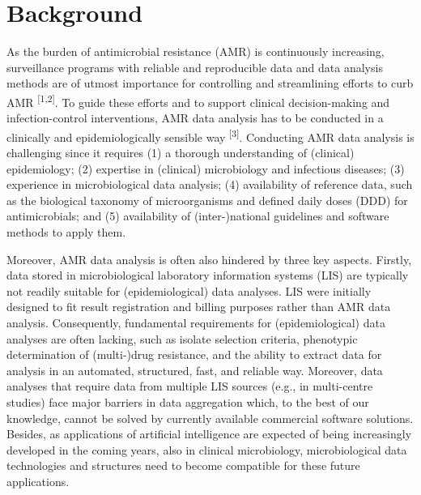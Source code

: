 \documentclass[
]{book}
\begin{document}
\hypertarget{background}{%
\section{Background}\label{background}}

As the burden of antimicrobial resistance (AMR) is continuously increasing, surveillance programs with reliable and reproducible data and data analysis methods are of utmost importance for controlling and streamlining efforts to curb AMR \textsuperscript{{[}1,2{]}}. To guide these efforts and to support clinical decision-making and infection-control interventions, AMR data analysis has to be conducted in a clinically and epidemiologically sensible way \textsuperscript{{[}3{]}}. Conducting AMR data analysis is challenging since it requires (1) a thorough understanding of (clinical) epidemiology; (2) expertise in (clinical) microbiology and infectious diseases; (3) experience in microbiological data analysis; (4) availability of reference data, such as the biological taxonomy of microorganisms and defined daily doses (DDD) for antimicrobials; and (5) availability of (inter-)national guidelines and software methods to apply them.

Moreover, AMR data analysis is often also hindered by three key aspects. Firstly, data stored in microbiological laboratory information systems (LIS) are typically not readily suitable for (epidemiological) data analyses. LIS were initially designed to fit result registration and billing purposes rather than AMR data analysis. Consequently, fundamental requirements for (epidemiological) data analyses are often lacking, such as isolate selection criteria, phenotypic determination of (multi-)drug resistance, and the ability to extract data for analysis in an automated, structured, fast, and reliable way. Moreover, data analyses that require data from multiple LIS sources (e.g., in multi-centre studies) face major barriers in data aggregation which, to the best of our knowledge, cannot be solved by currently available commercial software solutions. Besides, as applications of artificial intelligence are expected of being increasingly developed in the coming years, also in clinical microbiology, microbiological data technologies and structures need to become compatible for these future applications.
\end{document}
